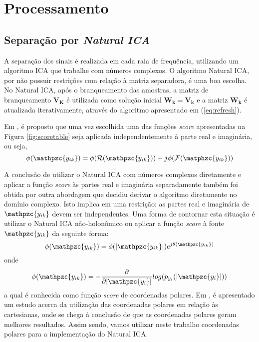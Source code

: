 \section{Processamento}

    \subsection{Separação por \textit{Natural ICA}}
    
        A separação dos sinais é realizada em cada raia de frequência, utilizando um algoritmo ICA que trabalhe com números complexos. O algoritmo Natural ICA, por não possuir restrições com relação à matriz separadora, é uma boa escolha. No Natural ICA, após o branqueamento das amostras, a matriz de branqueamento $\mathbf{V_K}$ é utilizada como solução inicial $\mathbf{W_k = V_k}$ e a matriz $\mathbf{W_k}$ é atualizada iterativamente, através do algoritmo apresentado em (\ref{eq:refresh}).
    
        Em \cite{real}, é proposto que uma vez escolhida uma das funções \textit{score} apresentadas na Figura \ref{fig:scoretable} seja aplicada independentemente à parte real e imaginária, ou seja,
        \begin{equation}
            \phi(\mathpzc{y_{ik}}) =\phi(\mathcal{R}(\mathpzc{y_{ik}})) + j\phi(\mathcal{F}(\matphzc{y_{ik}}))
        \end{equation}
    
        A conclusão de utilizar o Natural ICA com números complexos diretamente e aplicar a função \textit{score} às partes real e imaginária separadamente também foi obtida por outra abordagem que decidiu derivar o algoritmo diretamente no domínio complexo. Isto implica em uma restrição: as partes real e imaginária de $\mathpzc{y_{ik}}$ devem ser independentes. Uma forma de contornar esta situação é utilizar o Natural ICA não-holonômico ou aplicar a função \textit{score} à fonte $\mathpzc{y_{ik}}$ da seguinte forma:
        \begin{equation}
               \phi(\mathpzc{y_{ik}}) =\phi(|\mathpzc{y_{ik}}|)e^{j\theta(\mathpzc{y_{ik}})}
        \end{equation}
        onde 
        \begin{equation}
            \phi(\mathpzc{y_{ik}}) = - \frac{\partial}{\partial |\mathpzc{y_i}| }log(p_{y_i}(|\mathpzc{y_i}|))
        \end{equation}
        a qual é conhecida como função \textit{score} de coordenadas polares. Em \cite{LuizVictorio}, é apresentado um estudo acerca da utilização das coordenadas polares em relação às cartesianas, onde se chega à conclusão de que as coordenadas polares geram melhores resultados. Assim sendo, vamos utilizar neste trabalho coordenadas polares para a implementação do Natural ICA.
        
